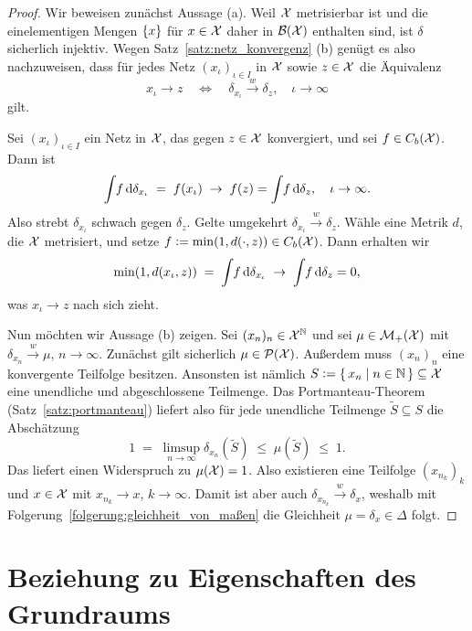 \documentclass[../thesis/thesis.tex]{subfiles}
\begin{document}
	\begin{proof}
		Wir beweisen zunächst Aussage (a). Weil $\mathcal{X}$ metrisierbar ist und die einelementigen Mengen $\left\{x\right\}$ für $x \in \mathcal{X}$ daher in $\mathcal{B}(\mathcal{X})$ enthalten sind, ist $\delta$ sicherlich injektiv.
		Wegen Satz~\ref{satz:netz_konvergenz} (b) genügt es also nachzuweisen, dass für jedes Netz $(x_\iota)_{\iota \in I}$ in $\mathcal{X}$ sowie $z \in \mathcal{X}$ die Äquivalenz
		\[ x_\iota \to z \quad \iff \quad \delta_{x_\iota} \xrightarrow{w} \delta_z, \quad \iota \to \infty \]
		gilt. 
		
		Sei  $(x_\iota)_{\iota \in I}$ ein Netz in $\mathcal{X}$, das gegen $z \in \mathcal{X}$ konvergiert, und sei $f \in C_b(\mathcal{X})$. Dann ist
		\[ \int_{} \, f \, \mathrm{d}\delta_{x_\iota} \; = \; f(x_\iota) \; \to \; f(z) = \int_{} \, f \, \mathrm{d}\delta_{z}, \quad \iota \to \infty \text{.} \]
		Also strebt $\delta_{x_\iota}$ schwach gegen $\delta_z$. Gelte umgekehrt $\delta_{x_\iota} \xrightarrow{w} \delta_z$. Wähle eine Metrik $d$, die $\mathcal{X}$ metrisiert, und
		setze $f \vcentcolon = \min (1, d(\cdot, z)) \in C_b(\mathcal{X})$. Dann erhalten wir 
		\[ \min (1, d(x_\iota, z)) \; = \; \int_{} \, f \, \mathrm{d}\delta_{x_\iota} \; \to \; \int_{} \, f \, \mathrm{d}\delta_{z} = 0 \text{,} \]
		was $x_\iota \to z$ nach sich zieht.
		
		Nun möchten wir Aussage (b) zeigen. Sei $(x_n)_n \in \mathcal{X}^{\mathbb{N}}$ und sei $\mu \in \mathcal{M}_{+}(\mathcal{X})$ mit $\delta_{x_n} \xrightarrow{w} \mu$, $n \to \infty$. Zunächst gilt sicherlich $\mu \in \mathcal{P}(\mathcal{X})$.
		Außerdem muss $(x_n)_n$ eine konvergente Teilfolge besitzen. Ansonsten ist nämlich $S \vcentcolon = \left\{\, x_n \; \middle| \; n \in \mathbb{N} \,\right\} \subseteq \mathcal{X}$ eine unendliche und abgeschlossene Teilmenge. Das Portmanteau-Theorem (Satz~\ref{satz:portmanteau}) liefert also für jede unendliche Teilmenge $\tilde{S} \subseteq S$ die Abschätzung
		\[ 1 \; = \; \limsup_{n \to \infty} \delta_{x_n}(\tilde{S}) \; \leq \; \mu(\tilde{S}) \; \leq \; 1 \text{.} \]
		Das liefert einen Widerspruch zu $\mu(\mathcal{X}) = 1$. Also existieren eine Teilfolge $(x_{n_k})_k$ und $x \in \mathcal{X}$ mit $x_{n_k} \to x$, $k \to \infty$. Damit ist aber auch $\delta_{x_{n_k}} \xrightarrow{w} \delta_x$, weshalb mit
		Folgerung~\ref{folgerung:gleichheit_von_maßen} die Gleichheit $\mu = \delta_x \in \Delta$ folgt.
	\end{proof}

	\section{Beziehung zu Eigenschaften des Grundraums}
	\label{subsec:beziehung_zu_eigenschaften_des_grundraums}
	
\end{document}
